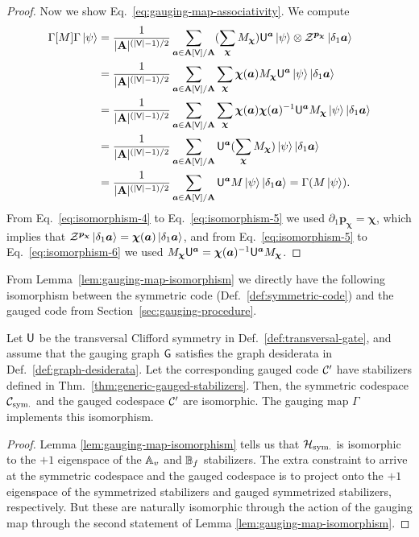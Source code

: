 \documentclass[11pt]{article}
\begin{document}
\begin{proof}
Now we show Eq.~\eqref{eq:gauging-map-associativity}.
We compute
\begin{align}
    \Gamma[M]\Gamma\ket{\psi}&= \frac{1}{|\mathbf{A}|^{(|\mathsf{V}|-1)/2}}\sum_{\bm a\in \mathbf{A}[\mathsf{V}]/\mathbf{A}}(\sum_{\bm{\bm{\chi}}}M_{\bm{\bm{\chi}}})\mathsf{U}^{\bm{a}}\ket{\psi}\otimes \mathcal{Z}^{\bm{p}_{\bm{\bm{\chi}}}}\ket{\delta_1\bm a}\label{eq:isomorphism-4}\\
    &= \frac{1}{|\mathbf{A}|^{(|\mathsf{V}|-1)/2}}\sum_{\bm a\in \mathbf{A}[\mathsf{V}]/\mathbf{A}}\sum_{\bm{\chi}} \bm{\chi}(\bm a)M_{\bm{\chi}} \mathsf{U}^{\bm a}\ket{\psi}\ket{\delta_1\bm a}\label{eq:isomorphism-5}\\
    &=\frac{1}{|\mathbf{A}|^{(|\mathsf{V}|-1)/2}}\sum_{\bm a\in \mathbf{A}[\mathsf{V}]/\mathbf{A}}\sum_{\bm{\chi}} \bm{\chi}(\bm a)\bm{\chi}(\bm a)^{-1} \mathsf{U}^{\bm a}M_{\bm{\chi}}\ket{\psi}\ket{\delta_1\bm a}\label{eq:isomorphism-6}\\
    &=\frac{1}{|\mathbf{A}|^{(|\mathsf{V}|-1)/2}}\sum_{\bm a\in \mathbf{A}[\mathsf{V}]/\mathbf{A}} \mathsf{U}^{\bm a}(\sum_{\bm{\chi}}M_{\bm{\chi}})\ket{\psi}\ket{\delta_1\bm a}\notag\\
    &=\frac{1}{|\mathbf{A}|^{(|\mathsf{V}|-1)/2}}\sum_{\bm a\in \mathbf{A}[\mathsf{V}]/\mathbf{A}} \mathsf{U}^{\bm a}M \ket{\psi}\ket{\delta_1\bm a} = \Gamma(M\ket{\psi}).\notag
\end{align}
From Eq.~\eqref{eq:isomorphism-4} to Eq.~\eqref{eq:isomorphism-5} we used  $\partial_1 \bm{p}_{\bm{\chi}} = \bm{\chi}$, which implies that
$\mathcal{Z}^{\bm{p}_{\bm{\bm{\chi}}}}\ket{\delta_1\bm a} = \bm{\chi} (\bm a) \ket{\delta_1 \bm a}$, and from Eq.~\eqref{eq:isomorphism-5} to Eq.~\eqref{eq:isomorphism-6} we used $M_{\bm{\chi}} \mathsf{U}^{\bm{a}} = \bm{\chi}(\bm a)^{-1} \mathsf{U}^{\bm{a}}M_{\bm{\chi}}$.

\end{proof}


From Lemma~\ref{lem:gauging-map-isomorphism} we directly have the following isomorphism between the symmetric code (Def.~\ref{def:symmetric-code}) and the gauged code from Section~\ref{sec:gauging-procedure}.
\begin{corollary}
\label{cor:sym-gau-isomorphism}
    Let $\mathsf{U}$ be the transversal Clifford symmetry in Def.~\ref{def:transversal-gate}, and assume that the gauging graph $\mathsf{G}$ satisfies the graph desiderata in Def.~\ref{def:graph-desiderata}. 
    Let the corresponding gauged code $\mathcal{C}'$ have stabilizers defined in Thm.~\ref{thm:generic-gauged-stabilizers}.
    Then, the symmetric codespace $\mathcal{C}_{\rm sym.}$ and the gauged codespace $\mathcal{C}'$ are isomorphic. The gauging map $\Gamma$ implements this isomorphism.
\end{corollary}
\begin{proof}
Lemma \ref{lem:gauging-map-isomorphism} tells us that $\mathcal H_{\rm sym.}$ is isomorphic to the $+1$ eigenspace of the $\mathbb{A}_v$ and $\mathbb{B}_f$ stabilizers. The extra constraint to arrive at the symmetric codespace and the gauged codespace is to project onto the $+1$ eigenspace of the symmetrized stabilizers and gauged symmetrized stabilizers, respectively. But these are naturally isomorphic through the action of the gauging map through the second statement of Lemma \ref{lem:gauging-map-isomorphism}. 
\end{proof}
\end{document}
